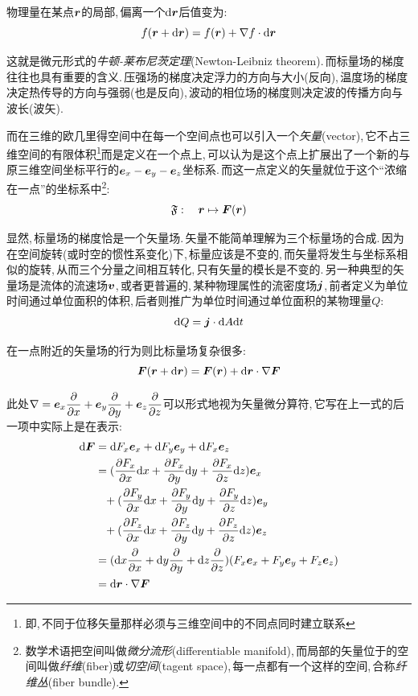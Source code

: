 物理量在某点\(\boldsymbol{r}\)的局部,\,偏离一个\(\textrm{d} \boldsymbol{r}\)后值变为:
\[f(\boldsymbol{r}+\textrm{d}\boldsymbol{r})=f(\boldsymbol{r})+\nabla f\cdot\textrm{d} \boldsymbol{r}\]

这就是微元形式的\emph{牛顿-莱布尼茨定理}(Newton-Leibniz theorem).\,而标量场的梯度往往也具有重要的含义.\,压强场的梯度决定浮力的方向与大小(反向),\,温度场的梯度决定热传导的方向与强弱(也是反向),\,波动的相位场的梯度则决定波的传播方向与波长(波矢).

而在三维的欧几里得空间中在每一个空间点也可以引入一个\emph{矢量}(vector),\,它不占三维空间的有限体积\footnote{即,\,不同于位移矢量那样必须与三维空间中的不同点同时建立联系}而是定义在一个点上,\,可以认为是这个点上扩展出了一个新的与原三维空间坐标平行的\(\boldsymbol{e}_x-\boldsymbol{e}_y-\boldsymbol{e}_z\)坐标系.\,而这一点定义的矢量就位于这个``浓缩在一点''的坐标系中\footnote{数学术语把空间叫做\emph{微分流形}(differentiable manifold),\,而局部的矢量位于的空间叫做\emph{纤维}(fiber)或\emph{切空间}(tagent space),\,每一点都有一个这样的空间,\,合称\emph{纤维丛}(fiber bundle).}:
\[\mathfrak{F}:\quad \boldsymbol{r}\mapsto\boldsymbol{F}(\boldsymbol{r})\]

显然,\,标量场的梯度恰是一个矢量场.\,矢量不能简单理解为三个标量场的合成.\,因为在空间旋转(或时空的惯性系变化)下,\,标量应该是不变的,\,而矢量将发生与坐标系相似的旋转,\,从而三个分量之间相互转化,\,只有矢量的模长是不变的.\,另一种典型的矢量场是流体的流速场\(\boldsymbol{v}\),\,或者更普遍的,\,某种物理属性的流密度场\(\boldsymbol{j}\),\,前者定义为单位时间通过单位面积的体积,\,后者则推广为单位时间通过单位面积的某物理量\(Q\):
\[\textrm{d} Q=\boldsymbol{j}\cdot\textrm{d} A\textrm{d} t\]

在一点附近的矢量场的行为则比标量场复杂很多:
\[\boldsymbol{F}(\boldsymbol{r}+\textrm{d}\boldsymbol{r})=\boldsymbol{F}(\boldsymbol{r})+\textrm{d} \boldsymbol{r}\cdot\nabla \boldsymbol{F}\]

此处\(\nabla=\boldsymbol{e}_x\dfrac{\partial}{\partial x}+\boldsymbol{e}_y\dfrac{\partial}{\partial y}+\boldsymbol{e}_z\dfrac{\partial}{\partial z}\)可以形式地视为矢量微分算符,\,它写在上一式的后一项中实际上是在表示:
\begin{align*}
\textrm{d} \boldsymbol{F} 	&=\textrm{d} F_x \boldsymbol{e}_x+\textrm{d} F_y \boldsymbol{e}_y+\textrm{d} F_x \boldsymbol{e}_z \\
			&=(\frac{\partial F_x}{\partial x}\textrm{d} x+\frac{\partial F_x}{\partial y}\textrm{d} y+\frac{\partial F_x}{\partial z}\textrm{d} z)\boldsymbol{e}_x\\
			&\phantom{=}+(\frac{\partial F_y}{\partial x}\textrm{d} x+\frac{\partial F_y}{\partial y}\textrm{d} y+\frac{\partial F_y}{\partial z}\textrm{d} z)\boldsymbol{e}_y\\
			&\phantom{=}+(\frac{\partial F_z}{\partial x}\textrm{d} x+\frac{\partial F_z}{\partial y}\textrm{d} y+\frac{\partial F_z}{\partial z}\textrm{d} z)\boldsymbol{e}_z\\
			&=(\textrm{d} x\frac{\partial}{\partial x}+\textrm{d} y\frac{\partial}{\partial y}+\textrm{d} z\frac{\partial}{\partial z})(F_x\boldsymbol{e}_x+F_y\boldsymbol{e}_y+F_z\boldsymbol{e}_z)\\
			&=\textrm{d} \boldsymbol{r}\cdot\nabla \boldsymbol{F}
\end{align*}

